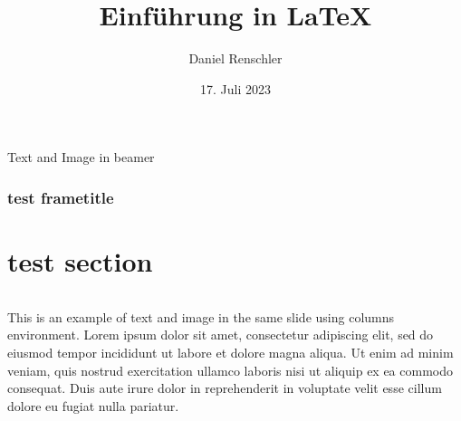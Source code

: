 \documentclass{beamer}
\title{Einf\"uhrung in \LaTeX}
\author{Daniel Renschler}
\date{17. Juli 2023}
\begin{document}
\begin{frame}
    \titlepage 
\end{frame}


\begin{frame}
    \tableofcontents
\end{frame}


\begin{frame}{Text and Image in beamer}
    \frametitle{test frametitle}
    \section{test section}
    \begin{columns}
        This is an example of text and image in the same slide using columns environment.
        \hfill
        Lorem ipsum dolor sit amet, consectetur adipiscing elit, sed do eiusmod tempor incididunt ut labore et dolore magna aliqua. Ut enim ad minim veniam, quis nostrud exercitation ullamco laboris nisi ut aliquip ex ea commodo consequat. Duis aute irure dolor in reprehenderit in voluptate velit esse cillum dolore eu fugiat nulla pariatur.
    \end{columns}
\end{frame}
\end{document}
